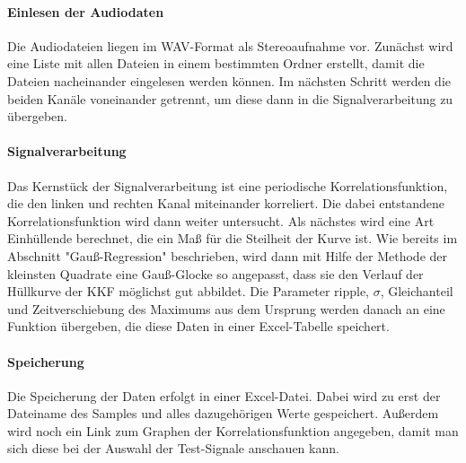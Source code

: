 \paragraph{Einlesen der Audiodaten}
Die Audiodateien liegen im WAV-Format als Stereoaufnahme vor. Zunächst wird eine Liste mit allen Dateien in einem bestimmten Ordner erstellt, damit die Dateien nacheinander eingelesen werden können. Im nächsten Schritt werden die beiden Kanäle voneinander getrennt, um diese dann in die Signalverarbeitung zu übergeben.
\paragraph{Signalverarbeitung}
Das Kernstück der Signalverarbeitung ist eine periodische Korrelationsfunktion, die den linken und rechten Kanal miteinander korreliert. Die dabei entstandene Korrelationsfunktion wird dann weiter untersucht. Als nächstes wird eine Art Einhüllende berechnet, die ein Maß für die Steilheit der Kurve ist. Wie bereits im Abschnitt "Gauß-Regression" beschrieben, wird dann mit Hilfe der Methode der kleinsten Quadrate eine Gauß-Glocke so angepasst, dass sie den Verlauf der Hüllkurve der KKF möglichst gut abbildet. Die Parameter ripple, $\sigma$, Gleichanteil und Zeitverschiebung des Maximums aus dem Ursprung werden danach an eine Funktion übergeben, die diese Daten in einer Excel-Tabelle speichert.
\paragraph{Speicherung}
Die Speicherung der Daten erfolgt in einer Excel-Datei. Dabei wird zu erst der Dateiname des Samples und alles dazugehörigen Werte gespeichert. Außerdem wird noch ein Link zum Graphen der Korrelationsfunktion angegeben, damit man sich diese bei der Auswahl der Test-Signale anschauen kann.

